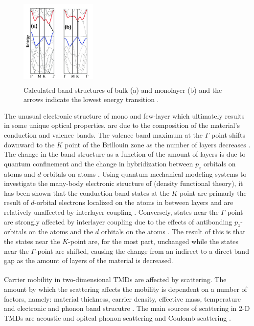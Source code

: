 \documentclass[%
 reprint,
 amsmath,amssymb,
 aps,
pra,
floatfix,
]{revtex4-1}
\begin{document}
\begin{figure}
\includegraphics[height=4.5cm, width=3.75cm]{../figs/mos2bandgap}
\caption{Calculated band structures of bulk (a) and monolayer (b)  and the arrows indicate the lowest energy transition \cite{Splendiani2010}.}
\label{fig:mos2bandgap}
\end{figure}
The unusual electronic structure of mono and few-layer  which ultimately results in some unique optical properties, are due to the composition of the material's conduction and valence bands. The valence band maximum at the $\Gamma$ point shifts downward to the $K$ point of the Brillouin zone as the number of layers decreases \cite{Mak2010, Splendiani2010}. The change in the band structure as a function of the amount of layers is due to quantum confinement and the change in hybridization between $p_z$ orbitals on  atoms and $d$ orbitals on  atoms \cite{Li2007, Mak2010, Splendiani2010}. Using quantum mechanical modeling systems to investigate the many-body electronic structure of  (density functional theory), it has been shown that the conduction band states at the $K$ point are primarly the result of $d$-orbital electrons localized on the  atoms in between layers and are relatively unaffected by interlayer coupling \cite{Kohn1964, Wang2012a}. Conversely, states near the $\Gamma$-point are strongly affected by interlayer coupling due to the effects of antibonding $p_z$-orbitals on the  atoms and the $d$ orbitals on the  atoms \cite{Splendiani2010}. The result of this is that the states near the $K$-point are, for the most part, unchanged while the states near the $\Gamma$-point are shifted, causing the change from an indirect to a direct band gap as the amount of layers of the material is decreased. 
\\ \\
Carrier mobility in two-dimensional TMDs are affected by scattering. The amount by which the scattering affects the mobility is dependent on a number of factors, namely: material thickness, carrier density, effective mass, temperature and electronic and phonon band strucutre \cite{Wang2012a}. The main sources of scattering in 2-D TMDs are acoustic and opitcal phonon scattering and Coulomb scattering \cite{Ando1982, Ridley1982}. 
\end{document}
